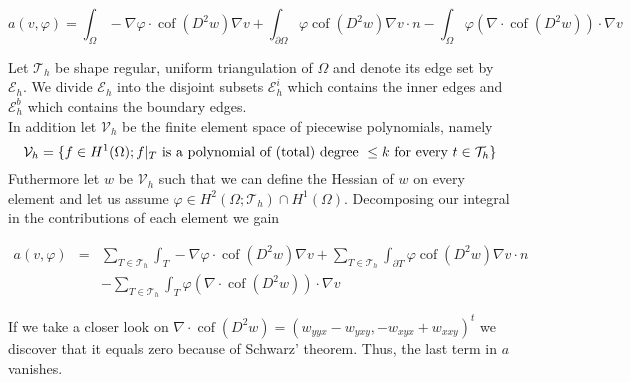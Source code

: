 \documentclass[a4paper,11pt]{article}
\newcommand{\myint}{\displaystyle\int}
\newcommand{\cof}{\operatorname{cof}}
\newcommand{\triang}{\mathcal{T}_h}
\begin{document}

\[
	a(v,\varphi) = \myint_{\Omega} -\nabla \varphi \cdot \cof(D^2 w) \nabla v + \myint_{\partial \Omega} \varphi\cof(D^2 w) \nabla v \cdot n 
	-  \myint_\Omega \varphi (\nabla \cdot \cof(D^2 w)) \cdot \nabla v
\]


Let $\mathcal{T}_h$ be shape regular, uniform triangulation of $\Omega$ and denote its edge set by $\mathcal{E}_h$. We divide $\mathcal E _h $ into the disjoint subsets $\mathcal{E}_h^i$ which contains the inner edges and $\mathcal{E}_h^b$ which contains the boundary edges. \\
In addition let $\mathcal V_h$ be the finite element space of piecewise polynomials, namely
\[
	\mathcal V_h = \{ f \in H^1(\Omega); f \arrowvert_T \textnormal{ is a polynomial of (total) degree } \leq k \textnormal{ for every } t \in \mathcal T_h\}
\]
Futhermore let $w$ be $\mathcal V_h$ such that we can define the Hessian of $w$ on every element and let us assume $\varphi \in H^2(\Omega; \triang) \cap H^1(\Omega)$.
 Decomposing our integral in the contributions of each element we gain

\begin{eqnarray*}
a(v, \varphi) &=& \sum_{T \in \triang} \myint_T -\nabla \varphi \cdot \cof(D^2 w) \nabla v + \sum_{T \in \triang}\myint_{\partial T} \varphi \cof(D^2 w) \nabla v \cdot n \\
	&&-  \sum_{T \in \triang} \myint_T \varphi (\nabla \cdot \cof(D^2 w)) \cdot \nabla v
\end{eqnarray*}

If we take a closer look on $\nabla \cdot \cof(D^2 w) = \left( w_{yyx}-w_{yxy}, -w_{xyx} + w_{xxy} \right)^t$ we discover that it equals zero because of Schwarz' theorem. Thus, the last term in $a$ vanishes.
\end{document}
